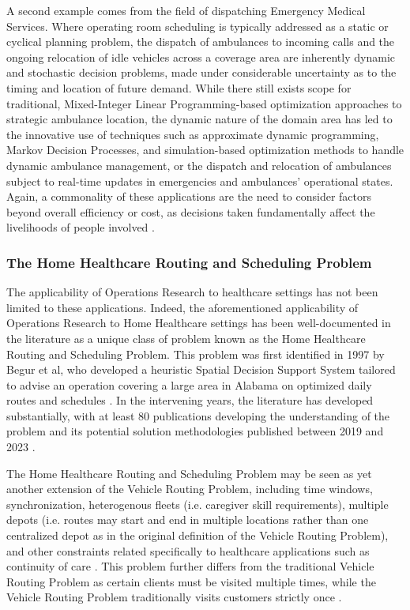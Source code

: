 \documentclass[11pt,twoside]{article}
\numberwithin{Theorem}{section}
\numberwithin{Definition}{section}
\numberwithin{Lemma}{section}
\numberwithin{Algorithm}{section}
\numberwithin{equation}{section}
\begin{document}
A second example comes from the field of dispatching Emergency Medical Services. Where operating room scheduling is typically addressed as a static or cyclical planning problem, the dispatch of ambulances to incoming calls and the ongoing relocation of idle vehicles across a coverage area are inherently dynamic and stochastic decision problems, made under considerable uncertainty as to the timing and location of future demand. While there still exists scope for traditional, Mixed-Integer Linear Programming-based optimization approaches to strategic ambulance location, the dynamic nature of the domain area has led to the innovative use of techniques such as approximate dynamic programming, Markov Decision Processes, and simulation-based optimization methods to handle dynamic ambulance management, or the dispatch and relocation of ambulances subject to real-time updates in emergencies and ambulances' operational states. Again, a commonality of these applications are the need to consider factors beyond overall efficiency or cost, as decisions taken fundamentally affect the livelihoods of people involved \cite{Jagtenberg2017}. 

\subsubsection{The Home Healthcare Routing and Scheduling Problem}

The applicability of Operations Research to healthcare settings has not been limited to these applications. Indeed, the aforementioned applicability of Operations Research to Home Healthcare settings has been well-documented in the literature as a unique class of problem known as the Home Healthcare Routing and Scheduling Problem. This problem was first identified in 1997 by Begur et al, who developed a heuristic Spatial Decision Support System tailored to advise an operation covering a large area in Alabama on optimized daily routes and schedules \cite{Masmoudi2024, begur97}. In the intervening years, the literature has developed substantially, with at least 80 publications developing the understanding of the problem and its potential solution methodologies published between 2019 and 2023 \cite{Masmoudi2024}. 

The Home Healthcare Routing and Scheduling Problem may be seen as yet another extension of the Vehicle Routing Problem, including time windows, synchronization, heterogenous fleets (i.e. caregiver skill requirements), multiple depots (i.e. routes may start and end in multiple locations rather than one centralized depot as in the original definition of the Vehicle Routing Problem), and other constraints related specifically to healthcare applications such as continuity of care \cite{atta25}. This problem further differs from the traditional Vehicle Routing Problem as certain clients must be visited multiple times, while the Vehicle Routing Problem traditionally visits customers strictly once \cite{Mankowska2014}. 
\end{document}
